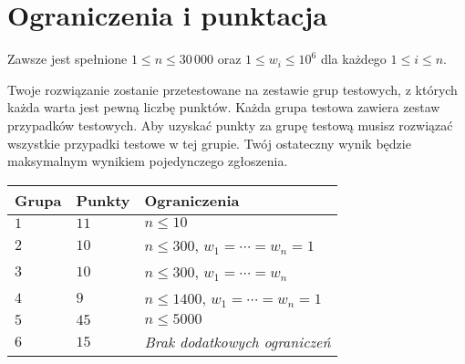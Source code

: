 \section*{Ograniczenia i punktacja}

Zawsze jest spełnione
$1\leq n \leq 30\,000$ %
oraz
$1\leq w_i \leq 10^6$ dla każdego $1\leq i \leq n$.%

Twoje rozwiązanie zostanie przetestowane na zestawie grup testowych, z których każda warta jest pewną liczbę punktów.
Każda grupa testowa zawiera zestaw przypadków testowych.
Aby uzyskać punkty za grupę testową musisz rozwiązać wszystkie przypadki testowe w tej grupie.
Twój ostateczny wynik będzie maksymalnym wynikiem pojedynczego zgłoszenia.

\medskip
\begin{tabular}{lll}
Grupa & Punkty & Ograniczenia \\\hline
$1$   & $11$ & $n\leq 10$ \\
$2$   & $10$ & $n\leq 300$, $w_1=\cdots=w_n = 1$ \\
$3$   & $10$ & $n\leq 300$, $w_1=\cdots=w_n$ \\ %
$4$   & $9$ & $n\leq 1400$, $w_1=\cdots=w_n = 1$ \\
$5$   & $45$ & $n\leq 5000$\\
$6$   & $15$ & \emph{Brak dodatkowych ograniczeń}
\end{tabular}
